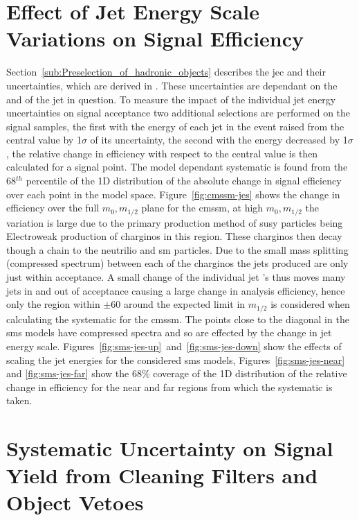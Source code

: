 \section{Effect of Jet Energy Scale Variations on Signal Efficiency} 
\label{sub:effects_of_jet_energy_scale_on_signal_efficiency}
Section~\ref{sub:Preselection_of_hadronic_objects} describes the \ac{jec} and 
their uncertainties, which are derived in \cite{Chatrchyan:2011ds}. These 
uncertainties are dependant on the \mETA and \ET of the jet in question. To 
measure the impact of the individual jet energy uncertainties on signal 
acceptance two additional selections are performed on the signal samples, the 
first with the energy of each jet in the event raised from the central value by 
1$\sigma$ of its uncertainty, the second with the energy decreased by 
1$\sigma$, the relative change in efficiency with respect to the central value 
is then calculated for a signal point. The model dependant systematic is found 
from the 68$^{th}$ percentile of the 1D distribution of the absolute change in 
signal efficiency over each point in the model space. 
Figure~\ref{fig:cmssm-jes} shows the change in efficiency over the full $m_{0}, 
m_{1/2}$ plane for the \ac{cmssm}, at high $m_{0}, m_{1/2}$ the variation is 
large due to the primary production method of 
\ac{susy} particles being Electroweak production of charginos in this region. 
These charginos then decay though a chain to the neutrilio and \ac{sm} 
particles. Due to the small mass splitting (compressed spectrum) between each of the charginos the jets produced are only just within \ET acceptance. A small 
change of the individual jet \ET's thus moves many jets in and out of 
acceptance causing a large change in analysis efficiency, hence only the region 
within $\pm$\unit{60}{\GeV} around the expected limit in $m_{1/2}$ is 
considered when calculating the systematic for the \ac{cmssm}. The points close 
to the diagonal in the \ac{sms} models have compressed spectra and so are 
effected by the change in jet energy scale. 
Figures~\ref{fig:sms-jes-up}~and~\ref{fig:sms-jes-down} show the effects of 
scaling the jet energies for the considered \ac{sms} models, 
Figures~\ref{fig:sms-jes-near} and \ref{fig:sms-jes-far} show the 68$\%$ 
coverage of the 1D distribution of the relative change in efficiency for the 
near and far regions from which the systematic is taken.

\section{Systematic Uncertainty on Signal Yield from Cleaning Filters and Object Vetoes} %
\label{sub:systematic_uncertainty_on_signal_yield_from_cleaning_filters_and_object_vetoes_}

